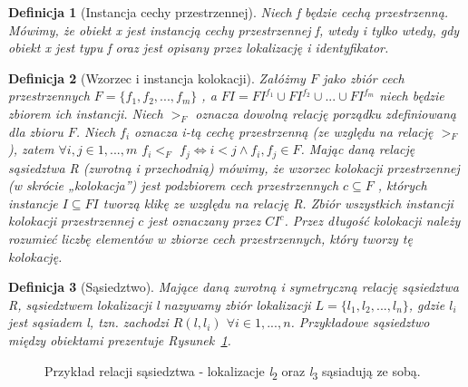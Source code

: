 \documentclass[12pt]{article}
\newtheorem{defin}{Definicja}
\begin{document}
\begin{defin}[Instancja cechy przestrzennej]
Niech f będzie cechą przestrzenną. Mówimy, że obiekt x jest instancją cechy przestrzennej f, wtedy i tylko wtedy, gdy obiekt x jest typu f oraz jest opisany przez lokalizację i identyfikator.
\end{defin}

\begin{defin}[Wzorzec i instancja kolokacji]
Załóżmy $F$ jako zbiór cech przestrzennych $F = \{ f_{1}, f_{2}, ...,f_{m} \} $ , a $FI = FI^{f_{1}} \cup FI^{f_{2}} \cup ... \cup FI^{f_{m}}$ niech będzie
zbiorem ich instancji. Niech $ >_{F} $ oznacza dowolną relację porządku zdefiniowaną dla zbioru $ F $. Niech $ f_{i} $ oznacza i-tą cechę przestrzenną (ze względu na relację $ >_{F} $), zatem $ \forall i,j \in 1,...,m $ $ f_{i} <_{F} $ $ f_{j} \Leftrightarrow i < j \land f_{i},f_{j} \in F $. Mając daną relację sąsiedztwa R (zwrotną i przechodnią) mówimy, że wzorzec kolokacji przestrzennej (w skrócie „kolokacja”) jest podzbiorem cech przestrzennych $ c \subseteq F $ , których instancje $ I\subseteq FI $ tworzą klikę ze względu na relację R. Zbiór wszystkich instancji kolokacji przestrzennej $c$ jest oznaczany przez $CI^{c} $. Przez długość kolokacji należy rozumieć liczbę elementów w zbiorze cech przestrzennych, który tworzy tę kolokację.
\end{defin}

\begin{defin}[Sąsiedztwo]
Mające daną zwrotną i symetryczną relację sąsiedztwa R, sąsiedztwem lokalizacji l nazywamy zbiór lokalizacji $L = \{l_{1},l_{2}, . . . , l_{n}\}$, gdzie $l_{i}$ jest sąsiadem l, tzn. zachodzi $R(l, l_{i}) $ $ \forall i \in 1,...,n$. Przykładowe sąsiedztwo między obiektami prezentuje Rysunek~\ref{fig:neigh}.
\end{defin}

\begin{figure}
\centering
{}
\caption{Przykład relacji sąsiedztwa - lokalizacje \textit{l}\textsubscript{2} oraz \textit{l}\textsubscript{3} sąsiadują ze sobą.}
\label{fig:neigh}
\end{figure}
\end{document}
